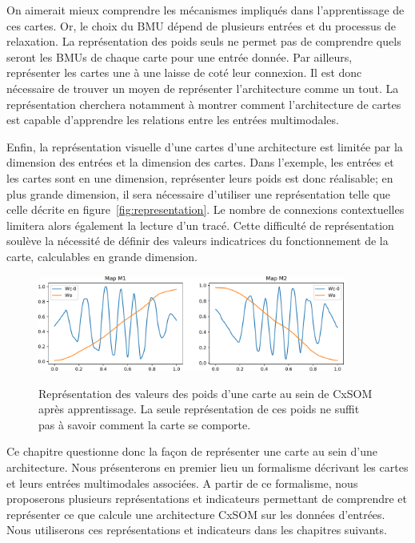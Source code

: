On aimerait mieux comprendre les mécanismes impliqués dans l'apprentissage de ces cartes. Or, le choix du BMU dépend de plusieurs entrées et du processus de relaxation. La représentation des poids seuls ne permet pas de comprendre quels seront les BMUs de chaque carte pour une entrée donnée. 
Par ailleurs, représenter les cartes une à une laisse de coté leur connexion. Il est donc nécessaire de trouver un moyen de représenter l'architecture comme un tout. La représentation cherchera notamment à montrer comment l'architecture de cartes est capable d'apprendre les relations entre les entrées multimodales.

Enfin, la représentation visuelle d'une cartes d'une architecture est limitée par la dimension des entrées et la dimension des cartes. Dans l'exemple, les entrées et les cartes sont en une dimension, représenter leurs poids est donc réalisable; en plus grande dimension, il sera nécessaire d'utiliser une représentation telle que celle décrite en figure~\ref{fig:representation}. Le nombre de connexions contextuelles limitera alors également la lecture d'un tracé. Cette difficulté de représentation soulève la nécessité de définir des valeurs indicatrices du fonctionnement de la carte, calculables en grande dimension.

\begin{figure}
\centering
\includegraphics[width=0.9\textwidth]{weights_cercle1.pdf}
\label{fig:weights}
\caption{Représentation des valeurs des poids d'une carte au sein de CxSOM après apprentissage. La seule représentation de ces poids ne suffit pas à savoir comment la carte se comporte.}
\end{figure}

Ce chapitre questionne donc la façon de représenter une carte au sein d'une architecture. Nous présenterons en premier lieu un formalisme décrivant les cartes et leurs entrées multimodales associées. A partir de ce formalisme, nous proposerons plusieurs représentations et indicateurs permettant de comprendre et représenter ce que calcule une architecture CxSOM sur les données d'entrées. Nous utiliserons ces représentations et indicateurs dans les chapitres suivants. 


